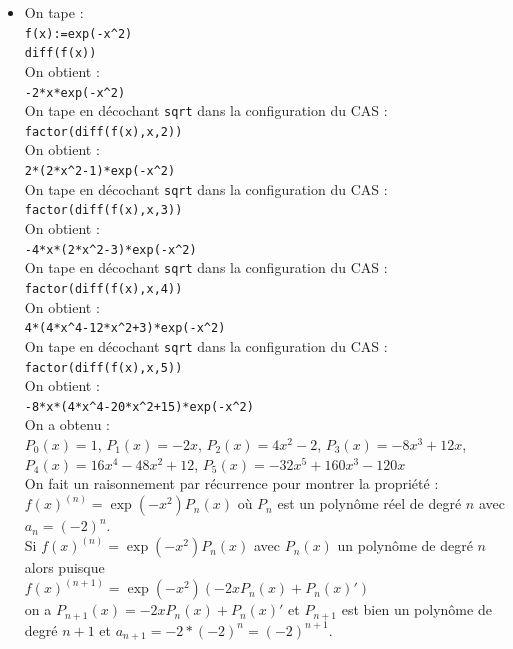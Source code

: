 \documentclass[a4paper,11pt]{book}
\begin{document}
\begin{itemize}
\item On tape :\\
{\tt f(x):=exp(-x\verb|^|2)}\\
{\tt diff(f(x))}\\
On obtient :\\
{\tt -2*x*exp(-x\verb|^|2)}\\
On tape en d\'ecochant {\tt sqrt} dans la configuration du CAS :\\
{\tt factor(diff(f(x),x,2))}\\
On obtient :\\
{\tt 2*(2*x\verb|^|2-1)*exp(-x\verb|^|2)}\\
On tape en d\'ecochant {\tt sqrt} dans la configuration du CAS :\\
{\tt factor(diff(f(x),x,3))}\\
On obtient :\\
{\tt -4*x*(2*x\verb|^|2-3)*exp(-x\verb|^|2)}\\
On tape en d\'ecochant {\tt sqrt} dans la configuration du CAS :\\
{\tt factor(diff(f(x),x,4))}\\
On obtient :\\
{\tt 4*(4*x\verb|^|4-12*x\verb|^|2+3)*exp(-x\verb|^|2)}\\
On tape en d\'ecochant {\tt sqrt} dans la configuration du CAS :\\
{\tt factor(diff(f(x),x,5))}\\
On obtient :\\
{\tt -8*x*(4*x\verb|^|4-20*x\verb|^|2+15)*exp(-x\verb|^|2)}\\
On a obtenu :\\
$P_0(x)=1$, $P_1(x)=-2x$, $P_2(x)=4x^2-2$, $P_3(x)=-8x^3+12x$,\\
$P_4(x)=16x^4-48x^2+12$, $P_5(x)=-32x^5+160x^3-120x$\\
On fait un raisonnement par r\'ecurrence pour montrer la propri\'et\'e :\\
$f(x)^{(n)}=\exp(-x^2)P_n(x)$ o\`u $P_n$ est un polyn\^ome r\'eel de degr\'e 
$n$ avec $a_n=(-2)^n$.\\
Si $f(x)^{(n)}=\exp(-x^2)P_n(x)$ avec $P_n(x)$ un polyn\^ome de degr\'e $n$ 
alors puisque \\
$f(x)^{(n+1)}=\exp(-x^2)(-2xP_n(x)+P_n(x)')$\\
on a $P_{n+1}(x)=-2xP_n(x)+P_{n}(x)'$ et $P_{n+1}$ est bien un polyn\^ome de 
degr\'e $n+1$ et $a_{n+1}=-2*(-2)^n=(-2)^{n+1}$.\\

\end{itemize}
\end{document}
